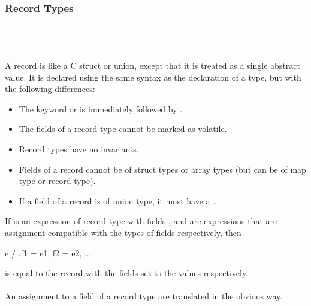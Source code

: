 \documentclass[preprint,nocopyrightspace]{sigplanconf}
\begin{document}
{{{\subsubsection{Record Types}
\\
\\\\
A record is like a C struct or union, except that it is treated as a single
abstract value. It is declared using the same syntax as the
declaration of a  type, but with the following
differences:
\begin{itemize}
\item The keyword  or  is immediately followed by
 .
\item The fields of a record type cannot be marked as volatile.
\item Record types have no invariants.
\item Fields of a record cannot be of struct types or array types (but
can be of map type or record type). 
\item If a field of a record is of union type, it must have
a .
\end{itemize}

If  is an expression of record type with
fields , and  are expressions that are
assignment compatible with the types of fields 
respectively, then
\begin{VCC}
  e / { .f1 = e1, f2 = e2, ...}
\end{VCC}
is equal to the record  with the fields  set
to the values  respectively.
\\\\
An assignment to a field of a record type are translated in the
obvious way.

}}}
\end{document}
